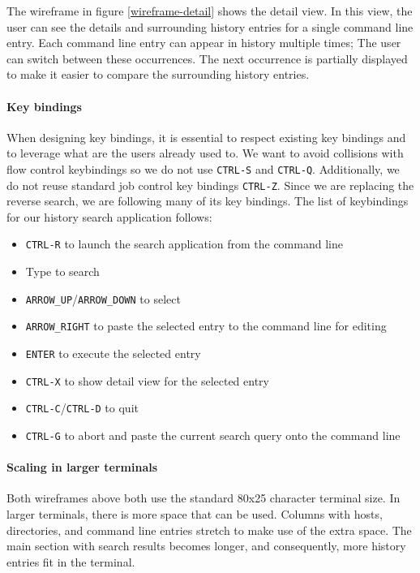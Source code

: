 The wireframe in figure \ref{wireframe-detail} shows the detail view. In this view, the user can see the details and surrounding history entries for a single command line entry. Each command line entry can appear in history multiple times; The user can switch between these occurrences. The next occurrence is partially displayed to make it easier to compare the surrounding history entries.



\paragraph{Key bindings}
When designing key bindings, it is essential to respect existing key bindings and to leverage what are the users already used to.
We want to avoid collisions with flow control keybindings so we do not use \verb|CTRL-S| and \verb|CTRL-Q|. Additionally, we do not reuse standard job control key bindings \verb|CTRL-Z|. 
Since we are replacing the reverse search, we are following many of its key bindings. The list of keybindings for our history search application follows:

\begin{itemize}
\item \verb|CTRL-R| to launch the search application from the command line
\item Type to search
\item \verb|ARROW_UP|/\verb|ARROW_DOWN| to select 
\item \verb|ARROW_RIGHT| to paste the selected entry to the command line for editing
\item \verb|ENTER| to execute the selected entry
\item \verb|CTRL-X| to show detail view for the selected entry
\item \verb|CTRL-C|/\verb|CTRL-D| to quit
\item \verb|CTRL-G| to abort and paste the current search query onto the command line
\end{itemize}


\paragraph{Scaling in larger terminals}

Both wireframes above both use the standard 80x25 character terminal size. In larger terminals, there is more space that can be used. Columns with hosts, directories, and command line entries stretch to make use of the extra space. The main section with search results becomes longer, and consequently, more history entries fit in the terminal. 

